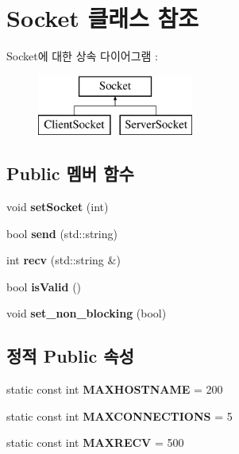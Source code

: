 \hypertarget{class_socket}{}\section{Socket 클래스 참조}
\label{class_socket}
Socket에 대한 상속 다이어그램 \+: \begin{figure}[H]
\begin{center}
\leavevmode
\includegraphics[height=2.000000cm]{class_socket}
\end{center}
\end{figure}
\subsection*{Public 멤버 함수}
\begin{DoxyCompactItemize}
\item 
\mbox{\label{class_socket_a1e97959d58aacfe15fcb816f69a6abea}} 
void {\bfseries set\+Socket} (int)
\item 
\mbox{\label{class_socket_a0e302c0343120e68de4b14d92c380602}} 
bool {\bfseries send} (std\+::string)
\item 
\mbox{\label{class_socket_aa9a708239a90e5fcfb99ef6bdcf9a10f}} 
int {\bfseries recv} (std\+::string \&)
\item 
\mbox{\label{class_socket_a5ccaf81da2b6f25dded056e6dbf7f410}} 
bool {\bfseries is\+Valid} ()
\item 
\mbox{\label{class_socket_aa4c720b61d6b72f84b9840a69cb9a4f2}} 
void {\bfseries set\+\_\+non\+\_\+blocking} (bool)
\end{DoxyCompactItemize}
\subsection*{정적 Public 속성}
\begin{DoxyCompactItemize}
\item 
\mbox{\label{class_socket_a95ebf343a953164be432383c6cc79d8e}} 
static const int {\bfseries M\+A\+X\+H\+O\+S\+T\+N\+A\+ME} = 200
\item 
\mbox{\label{class_socket_ad738cdd807348f6894e56c2056791790}} 
static const int {\bfseries M\+A\+X\+C\+O\+N\+N\+E\+C\+T\+I\+O\+NS} = 5
\item 
\mbox{\label{class_socket_a394c9e662527effc414231eee048634c}} 
static const int {\bfseries M\+A\+X\+R\+E\+CV} = 500
\end{DoxyCompactItemize}

